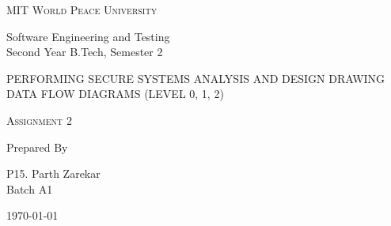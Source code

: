 \documentclass[16pt]{article}
\begin{document}
\begin{titlepage}
	\centering


	\huge\textsc{
		MIT World Peace University
	}\\

	\vspace{1\baselineskip} %

	\LARGE{
		Software Engineering and Testing\\
		Second Year B.Tech, Semester 2
	}

	\vfill %


	\vspace{1\baselineskip} %



	\huge{\textsc{
        PERFORMING SECURE SYSTEMS
        ANALYSIS AND DESIGN
        DRAWING DATA FLOW DIAGRAMS (LEVEL 0, 1, 2)
		}} \\




	\vspace{7\baselineskip} %


	\LARGE\textsc{
		Assignment 2
			} %
	\vfill


	Prepared By
	\vspace{0.5\baselineskip} %

	\Large{
		P15. Parth Zarekar\\
		\vspace{1cm}
		Batch A1
	}


	\vspace{0.5\baselineskip} %
	\today

\end{titlepage}
\end{document}
